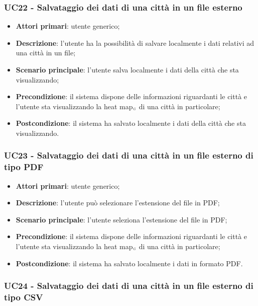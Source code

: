 \subsubsection{UC22 - Salvataggio dei dati di una città in un file esterno}\label{CasiDUsoCasiDUsoFacoltativiTraUnUtenteEIlFrontEndElencoCasiDUsoUC14SalvataggioDeiDatiDiUnaCittaInUnFileEsterno}


\begin{itemize}
	\item \textbf{Attori primari}: utente generico;
	\item \textbf{Descrizione}: l’utente ha la possibilità di salvare localmente i dati relativi ad una città in un file;
	\item \textbf{Scenario principale}: l’utente salva localmente i dati della città che sta visualizzando;
	\item \textbf{Precondizione}: il sistema dispone delle informazioni riguardanti le città e  l’utente sta visualizzando la heat map$_{\scaleto{G}{3pt}}$ di una città in particolare;
	\item \textbf{Postcondizione}: il sistema ha salvato localmente i dati della città che sta visualizzando.
\end{itemize}

\subsubsection{UC23 - Salvataggio dei dati di una città in un file esterno di tipo PDF}\label{CasiDUsoCasiDUsoFacoltativiTraUnUtenteEIlFrontEndElencoCasiDUsoUC141SalvataggioDeiDatiDiUnaCittaInUnFileEsternoDiTipoPdf}

\begin{itemize}
	\item \textbf{Attori primari}: utente generico;
	\item \textbf{Descrizione}: l’utente può selezionare l’estensione del file in PDF;
	\item \textbf{Scenario principale}: l’utente seleziona l’estensione del file in PDF;
	\item \textbf{Precondizione}: il sistema dispone delle informazioni riguardanti le città e  l’utente sta visualizzando la heat map$_{\scaleto{G}{3pt}}$ di una città in particolare;
	\item \textbf{Postcondizione}: il sistema ha salvato localmente i dati in formato PDF.
\end{itemize}

\subsubsection{UC24 - Salvataggio dei dati di una città in un file esterno di tipo CSV}\label{CasiDUsoCasiDUsoFacoltativiTraUnUtenteEIlFrontEndElencoCasiDUsoUC142SalvataggioDeiDatiDiUnaCittaInUnFileEsternoDiTipoCsv}

